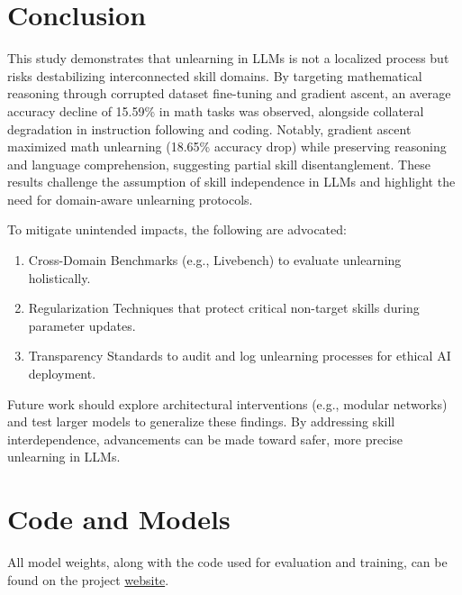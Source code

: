 \documentclass[10pt]{article}
\begin{document}
\section{Conclusion}
\label{sec:conclusion}
This study demonstrates that unlearning in LLMs is not a localized process but risks destabilizing interconnected skill domains. By targeting mathematical reasoning through corrupted dataset fine-tuning and gradient ascent, an average accuracy decline of 15.59\% in math tasks was observed, alongside collateral degradation in instruction following and coding. Notably, gradient ascent maximized math unlearning (18.65\% accuracy drop) while preserving reasoning and language comprehension, suggesting partial skill disentanglement. These results challenge the assumption of skill independence in LLMs and highlight the need for domain-aware unlearning protocols.

To mitigate unintended impacts, the following are advocated:
\begin{enumerate}
    \item Cross-Domain Benchmarks (e.g., Livebench) to evaluate unlearning holistically.
    \item Regularization Techniques that protect critical non-target skills during parameter updates.
    \item Transparency Standards to audit and log unlearning processes for ethical AI deployment.
\end{enumerate}
Future work should explore architectural interventions (e.g., modular networks) and test larger models to generalize these findings. By addressing skill interdependence, advancements can be made toward safer, more precise unlearning in LLMs.

\section{Code and Models}
All model weights, along with the code used for evaluation and training, can be found on the project \href{https://johnphan19.github.io/csci5541-final-project/}{website}.
% 

\end{document}
